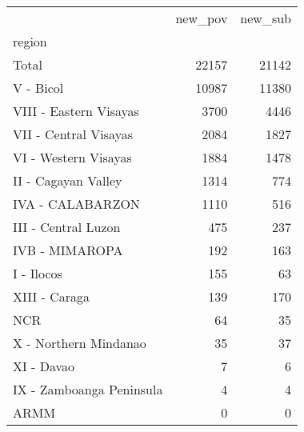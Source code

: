 \begin{tabular}{lrr}
\toprule
{} &  new\_pov &  new\_sub \\
region                   &          &          \\
\midrule
Total                    &    22157 &    21142 \\
V - Bicol                &    10987 &    11380 \\
VIII - Eastern Visayas   &     3700 &     4446 \\
VII - Central Visayas    &     2084 &     1827 \\
VI - Western Visayas     &     1884 &     1478 \\
II - Cagayan Valley      &     1314 &      774 \\
IVA - CALABARZON         &     1110 &      516 \\
III - Central Luzon      &      475 &      237 \\
IVB - MIMAROPA           &      192 &      163 \\
I - Ilocos               &      155 &       63 \\
XIII - Caraga            &      139 &      170 \\
NCR                      &       64 &       35 \\
X - Northern Mindanao    &       35 &       37 \\
XI - Davao               &        7 &        6 \\
IX - Zamboanga Peninsula &        4 &        4 \\
ARMM                     &        0 &        0 \\
\bottomrule
\end{tabular}
